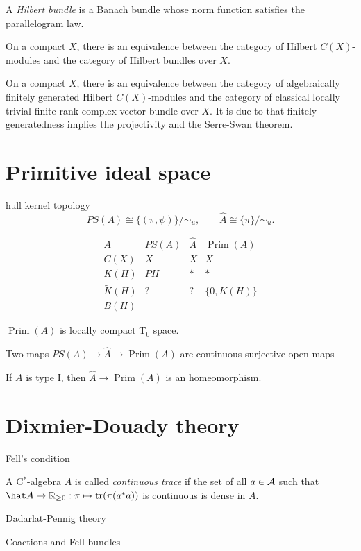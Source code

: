 \documentclass{../../large}
\newcommand{\Prim}{\operatorname{Prim}}
\begin{document}
\begin{prb}
A \emph{Hilbert bundle} is a Banach bundle whose norm function satisfies the parallelogram law.

\begin{parts}
\item On a compact $X$, there is an equivalence between the category of Hilbert $C(X)$-modules and the category of Hilbert bundles over $X$.
\item On a compact $X$, there is an equivalence between the category of algebraically finitely generated Hilbert $C(X)$-modules and the category of classical locally trivial finite-rank complex vector bundle over $X$.
It is due to that finitely generatedness implies the projectivity and the Serre-Swan theorem.
\end{parts}
\end{prb}


\section{Primitive ideal space}

\begin{prb}
\end{prb}

\begin{prb}
hull kernel topology
\[PS(A)\cong\{(\pi,\psi)\}/\sim_u,\qquad\hat A\cong\{\pi\}/\sim_u.\]

\[\begin{array}{c|ccc}
A & PS(A) & \hat A & \Prim(A) \\\hline
C(X) & X & X & X \\
K(H) & PH & * & * \\
\tilde K(H) & ? & ? & \{0,K(H)\} \\
B(H) &&&
\end{array}\]
\begin{parts}
\item $\Prim(A)$ is locally compact T$_0$ space.
\item Two maps $PS(A)\to\hat A\to\Prim(A)$ are continuous surjective open maps
\item If $A$ is type I, then $\hat A\to\Prim(A)$ is an homeomorphism.
\end{parts}

\end{prb}

\begin{prb}
\end{prb}


\section{Dixmier-Douady theory}


Fell's condition

A C$^*$-algebra $A$ is called \emph{continuous trace} if the set of all $a\in\mathcal{A}$ such that $\hat A\to\R_{\ge0}:\pi\mapsto\tr(\pi(a^*a))$ is continuous is dense in $A$.



Dadarlat-Pennig theory


Coactions and Fell bundles
\end{document}
